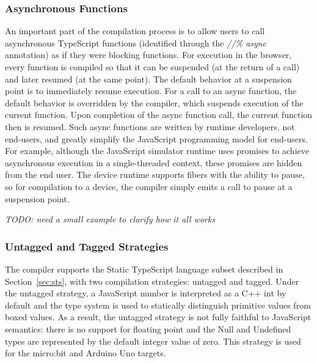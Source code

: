 \subsubsection{Asynchronous Functions}

An important part of the compilation process is to allow users to call asynchronous 
TypeScript functions (identified through the \emph{//\% async} annotation) 
as if they were blocking functions.  
For execution in the browser,
every function is compiled so that it can be suspended (at the return of a call) and later resumed (at the same point). 
The default behavior at a suspension point is to immediately resume execution.  For a call to an async function,
the default behavior is overridden by the compiler, which suspends execution of the current function. 
Upon completion of the async function call, the current function then is resumed. Such async functions are written
by runtime developers, not end-users, and greatly simplify the JavaScript
programming model for end-users. For example, although the JavaScript simulator runtime uses promises to 
achieve asynchronous execution in a single-threaded context, these promises are hidden from the end user. 
The \CO device runtime supports fibers with the ability to pause, so for compilation to a device, 
the compiler simply emits a call to pause at a suspension point. 

\emph{TODO: need a small example to clarify how it all works}


\subsubsection{Untagged and Tagged Strategies}

The \MC compiler supports the Static TypeScript language subset described in Section~\ref{sec:sts},
with two compilation strategies: untagged and tagged. Under the untagged strategy,
a JavaScript number is interpreted as a C++ int by default and the type system is used
to statically distinguish primitive values from boxed values. As a result, the untagged
strategy is not fully faithful to JavaScript semantics: there is no support for floating
point and the Null and Undefined types are represented by the default integer value of zero.
This strategy is used for the micro:bit and Arduino Uno targets. 


